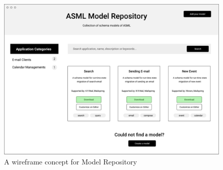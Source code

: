 \FloatBarrier
\begin{figure}[H]
    \includegraphics[width=\linewidth]{../figures/model-repo.pdf}
    \centering
    \caption{A wireframe concept for Model Repository}
    \label{fig:model-repo}
\end{figure}
\FloatBarrier